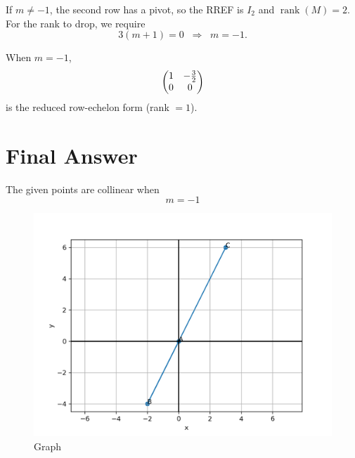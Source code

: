 \documentclass[12pt]{article}
\begin{document}
If \(m\neq -1\), the second row has a pivot, so the RREF is \(I_2\) and \(\operatorname{rank}(M)=2\).  
For the rank to drop, we require
\[
3(m+1)=0 \;\;\Rightarrow\;\; m=-1.
\]

When \(m=-1\),
\[
\myvec{1 & -\tfrac{3}{2} \\ 0 & 0}
\]
is the reduced row-echelon form (rank \(=1\)).

\medskip

\section*{Final Answer}
The given points are collinear when
\[
\boxed{m = -1}
\]

\begin{figure}[h!]
    \centering
    \includegraphics[width=0.65\linewidth]{figs/fig.png}
    \caption{Graph}
\end{figure}
\end{document}
